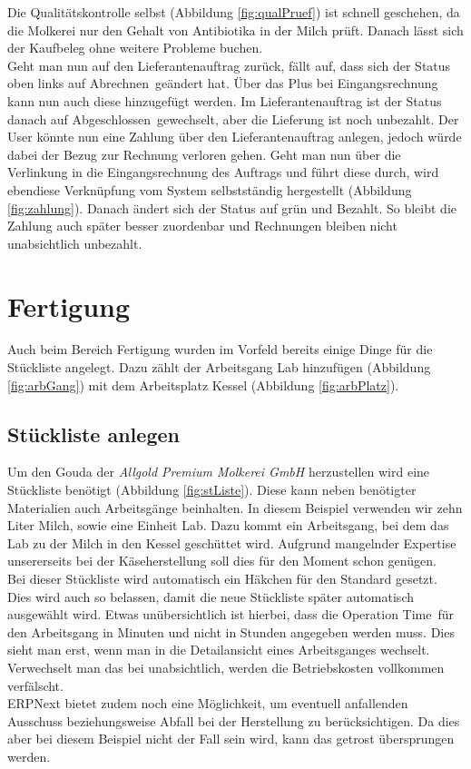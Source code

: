 Die Qualitätskontrolle selbst (\vgl Abbildung \ref{fig:qualPruef}) ist schnell geschehen, da die Molkerei nur den Gehalt von Antibiotika in der Milch prüft. Danach lässt sich der Kaufbeleg ohne weitere Probleme buchen. \\
Geht man nun auf den Lieferantenauftrag zurück, fällt auf, dass sich der Status oben links auf \glqq Abrechnen\grqq\ geändert hat. Über das Plus bei Eingangsrechnung kann nun auch diese hinzugefügt werden. Im Lieferantenauftrag ist der Status danach auf \glqq Abgeschlossen\grqq\ gewechselt, aber die Lieferung ist noch unbezahlt. Der User könnte nun eine Zahlung über den Lieferantenauftrag anlegen, jedoch würde dabei der Bezug zur Rechnung verloren gehen. Geht man nun über die Verlinkung in die Eingangsrechnung des Auftrags und führt diese durch, wird ebendiese Verknüpfung vom System selbstständig hergestellt (\vgl Abbildung \ref{fig:zahlung}). Danach ändert sich der Status auf grün und \glqq Bezahlt\grqq. So bleibt die Zahlung auch später besser zuordenbar und Rechnungen bleiben nicht unabsichtlich unbezahlt.

\section{Fertigung}
Auch beim Bereich Fertigung wurden im Vorfeld bereits einige Dinge für die Stückliste angelegt. Dazu zählt der Arbeitsgang Lab hinzufügen (\vgl Abbildung \ref{fig:arbGang}) mit dem Arbeitsplatz Kessel (\vgl Abbildung \ref{fig:arbPlatz}).

\subsection{Stückliste anlegen}
Um den Gouda der \emph{Allgold Premium Molkerei GmbH} herzustellen wird eine Stückliste benötigt (\vgl Abbildung \ref{fig:stListe}). Diese kann neben benötigter Materialien auch Arbeitsgänge beinhalten. In diesem Beispiel verwenden wir zehn Liter Milch, sowie eine Einheit Lab. Dazu kommt ein Arbeitsgang, bei dem das Lab zu der Milch in den Kessel geschüttet wird. Aufgrund mangelnder Expertise unsererseits bei der Käseherstellung soll dies für den Moment schon genügen. \\
Bei dieser Stückliste wird automatisch ein Häkchen für den Standard gesetzt. Dies wird auch so belassen, damit die neue Stückliste später automatisch ausgewählt wird. 
Etwas unübersichtlich ist hierbei, dass die \glqq Operation Time\grqq\ für den Arbeitsgang in Minuten und nicht in Stunden angegeben werden muss. Dies sieht man erst, wenn man in die Detailansicht eines Arbeitsganges wechselt. Verwechselt man das bei unabsichtlich, werden die Betriebskosten vollkommen verfälscht. \\
ERPNext bietet zudem noch eine Möglichkeit, um eventuell anfallenden Ausschuss beziehungsweise Abfall bei der Herstellung zu berücksichtigen. Da dies aber bei diesem Beispiel nicht der Fall sein wird, kann das getrost übersprungen werden.

